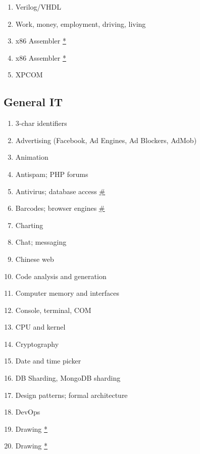 \documentclass[conference,10pt]{IEEEtran}
\begin{document}
 \begin{figure}[H]
 \begin{multicols}{2}
 \begin{enumerate}
    \setcounter{enumi}{\value{topics}}
    \item Verilog/VHDL
    \item Work, money, employment, driving, living
    \item x86 Assembler \hyperref[duplicate]{*}
    \item x86 Assembler \hyperref[duplicate]{*}
    \item XPCOM
    \setcounter{topics}{\value{enumi}}
 \end{enumerate}
 \end{multicols}
 \subsection{General IT}
 \begin{multicols}{2}
 \begin{enumerate}
    \setcounter{enumi}{\value{topics}}
    \item 3-char identifiers
    \item Advertising (Facebook, Ad Engines, Ad Blockers, AdMob)
    \item Animation
    \item Antispam; PHP forums
    \item Antivirus; database access \hyperref[dual]{\#}
    \item Barcodes; browser engines \hyperref[dual]{\#}
    \item Charting
    \item Chat; messaging
    \item Chinese web
    \item Code analysis and generation
    \item Computer memory and interfaces
    \item Console, terminal, COM
    \item CPU and kernel
    \item Cryptography
    \item Date and time picker
    \item DB Sharding, MongoDB sharding
    \item Design patterns; formal architecture
    \item DevOps
    \item Drawing \hyperref[duplicate]{*}
    \item Drawing \hyperref[duplicate]{*}

\end{enumerate}
\end{multicols}
\end{figure}
\end{document}

